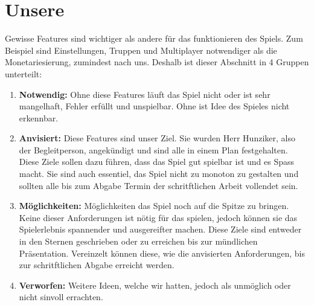 \section {Unsere}
Gewisse Features sind wichtiger als andere für das funktionieren des Spiels.
Zum Beispiel sind Einstellungen, Truppen und Multiplayer notwendiger als die Monetariesierung, zumindest nach uns.
Deshalb ist dieser Abschnitt in 4 Gruppen unterteilt:
\begin{enumerate}
    \item \textbf{Notwendig:}
        Ohne diese Features läuft das Spiel nicht oder ist sehr mangelhaft,
        Fehler erfüllt und unspielbar. Ohne ist Idee des Spieles nicht erkennbar.
    \item \textbf{Anvisiert:}
        Diese Features sind unser Ziel. Sie wurden Herr Hunziker, also der Begleitperson, angekündigt und sind alle in einem Plan festgehalten.
        Diese Ziele sollen dazu führen, dass das Spiel
        gut spielbar ist und es Spass macht. Sie sind auch essentiel, das Spiel nicht zu monoton zu gestalten und sollten
        alle bis zum Abgabe Termin der schritftlichen Arbeit vollendet sein.
    \item \textbf{Möglichkeiten:}
        Möglichkeiten das Spiel noch auf die Spitze zu bringen. Keine dieser Anforderungen ist nötig
        für das spielen, jedoch können sie das Spielerlebnis spannender und ausgereifter machen. Diese
        Ziele sind entweder in den Sternen geschrieben oder zu erreichen bis zur mündlichen Präsentation.
        Vereinzelt können diese, wie die anvisierten Anforderungen, bis zur schritftlichen Abgabe erreicht werden.
    \item \textbf{Verworfen:}
        Weitere Ideen, welche wir hatten, jedoch als unmöglich oder nicht sinvoll errachten.
\end{enumerate}

